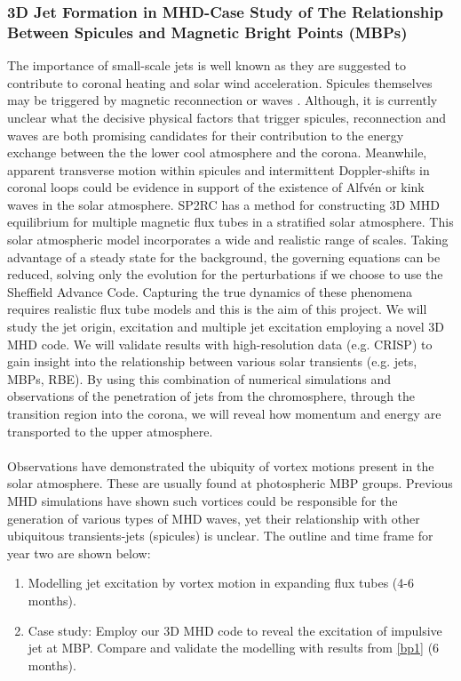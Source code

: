 \documentclass[12pt,a4paper,twoside]{article}
\newcommand{\Alfven}{Alfv\'{e}n }
\begin{document}
\subsubsection{3D Jet Formation in MHD-Case Study of The Relationship Between Spicules and Magnetic Bright Points (MBPs)} \label{sec2}
The importance of small-scale jets is well known as they are suggested to contribute to coronal heating and solar wind acceleration. Spicules themselves may be triggered by magnetic reconnection \citep{Pontieu2007} or waves \citep{DePontieu2004}. Although, it is currently unclear what the decisive physical factors that trigger spicules, reconnection and waves are both promising candidates for their contribution to the energy exchange between the the lower cool atmosphere and the corona. Meanwhile, apparent transverse motion within spicules and intermittent Doppler-shifts in coronal loops could be evidence in support of the existence of \Alfven or kink waves in the solar atmosphere. SP2RC has a method for constructing 3D MHD equilibrium for multiple magnetic flux tubes in a stratified solar atmosphere. This solar atmospheric model incorporates a wide and realistic range of scales. Taking advantage of a steady state for the background, the governing equations can be reduced, solving only the evolution for the perturbations if we choose to use the Sheffield Advance Code. Capturing the true dynamics of these phenomena requires realistic flux tube models and this is the aim of this project. We will study the jet origin, excitation and multiple jet excitation employing a novel 3D MHD code. We will validate results with high-resolution data (e.g. CRISP) to gain insight into the relationship between various solar transients (e.g. jets, MBPs, RBE). By using this combination of numerical simulations and observations of the penetration of jets from the chromosphere, through the transition region into the corona, we will reveal how momentum and energy are transported to the upper atmosphere. \\ \\
Observations have demonstrated the ubiquity of vortex motions present in the solar atmosphere. These are usually found at photospheric MBP groups. Previous MHD simulations have shown such vortices could be responsible for the generation of various types of MHD waves, yet their relationship with other ubiquitous transients-jets (spicules) is unclear. The outline and time frame for year two are shown below:
\begin{enumerate}
\item Modelling jet excitation by vortex motion in expanding flux tubes (4-6 months). \label{bp1}
\item Case study: Employ our 3D MHD code to reveal the excitation of impulsive jet at MBP. Compare and validate the modelling with results from \eqref{bp1} (6 months).  
\end{enumerate}
\end{document}
